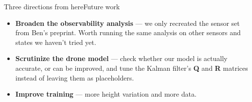 \documentclass[aspectratio=169]{beamer}
\begin{document}
\begin{frame}{Three directions from here}{Future work}
  \begin{itemize}
    \setlength{\itemsep}{1.2em}
    \item \textbf{Broaden the observability analysis} --- we only recreated the
      sensor set from Ben's preprint. Worth running the same analysis on other
      sensors and states we haven't tried yet.
    \item \textbf{Scrutinize the drone model} --- check whether our model is actually
      accurate, or can be improved, and tune the Kalman filter's \textbf{Q} and
      \textbf{R} matrices instead of leaving them as placeholders.
    \item \textbf{Improve training} --- more height variation and more data.
  \end{itemize}
\end{frame}
\end{document}
